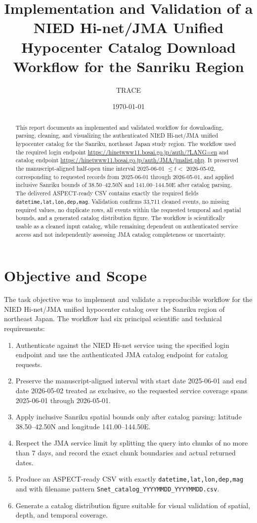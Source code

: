 \documentclass[11pt]{article}
\title{Implementation and Validation of a NIED Hi-net/JMA Unified Hypocenter Catalog Download Workflow for the Sanriku Region}
\author{TRACE}
\date{\today}
\begin{document}
\maketitle

\begin{abstract}
This report documents an implemented and validated workflow for downloading, parsing, cleaning, and visualizing the authenticated NIED Hi-net/JMA unified hypocenter catalog for the Sanriku, northeast Japan study region. The workflow used the required login endpoint \url{https://hinetwww11.bosai.go.jp/auth/?LANG=en} and catalog endpoint \url{https://hinetwww11.bosai.go.jp/auth/JMA/jmalist.php}. It preserved the manuscript-aligned half-open time interval $2025$-06-01 $\leq t <$ $2026$-05-02, corresponding to requested records from 2025-06-01 through 2026-05-01, and applied inclusive Sanriku bounds of 38.50--42.50\textdegree{}N and 141.00--144.50\textdegree{}E after catalog parsing. The delivered ASPECT-ready CSV contains exactly the required fields \texttt{datetime,lat,lon,dep,mag}. Validation confirms 33,711 cleaned events, no missing required values, no duplicate rows, all events within the requested temporal and spatial bounds, and a generated catalog distribution figure. The workflow is scientifically usable as a cleaned input catalog, while remaining dependent on authenticated service access and not independently assessing JMA catalog completeness or uncertainty.
\end{abstract}

\section{Objective and Scope}

The task objective was to implement and validate a reproducible workflow for the NIED Hi-net/JMA unified hypocenter catalog over the Sanriku region of northeast Japan. The workflow had six principal scientific and technical requirements:

\begin{enumerate}
  \item Authenticate against the NIED Hi-net service using the specified login endpoint and use the authenticated JMA catalog endpoint for catalog requests.
  \item Preserve the manuscript-aligned interval with start date 2025-06-01 and end date 2026-05-02 treated as exclusive, so the requested service coverage spans 2025-06-01 through 2026-05-01.
  \item Apply inclusive Sanriku spatial bounds only after catalog parsing: latitude 38.50--42.50\textdegree{}N and longitude 141.00--144.50\textdegree{}E.
  \item Respect the JMA service limit by splitting the query into chunks of no more than 7 days, and record the exact chunk boundaries and actual returned dates.
  \item Produce an ASPECT-ready CSV with exactly \texttt{datetime,lat,lon,dep,mag} and with filename pattern \texttt{Snet\_catalog\_YYYYMMDD\_YYYYMMDD.csv}.
  \item Generate a catalog distribution figure suitable for visual validation of spatial, depth, and temporal coverage.
\end{enumerate}
\end{document}
